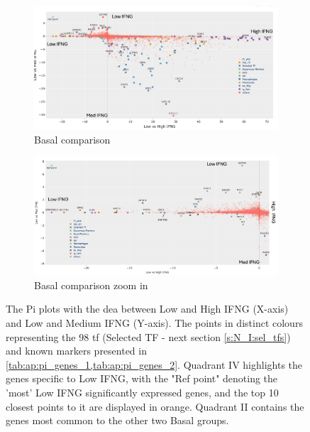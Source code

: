 \begin{figure}[H]
    \centering
    \begin{subfigure}[!t]{1.0\textwidth}
        \includegraphics[width=\textwidth,keepaspectratio]{Sections/ClusteringAnalysis/Resources/discussion/basal_comp_pi.png}    
        \caption{Basal comparison}
        \label{fig:cs:basal_comp}
    \end{subfigure}
    \centering
    \begin{subfigure}[!t]{1.0\textwidth}
        \includegraphics[width=\textwidth, keepaspectratio]{Sections/ClusteringAnalysis/Resources/discussion/basal_comp_pi_zoom.png}
        \caption{Basal comparison zoom in}
        \label{fig:cs:basal_comp_zoom}
    \end{subfigure} 
    \centering
    \caption{The Pi plots with the \acrshort{dea} between Low and High IFNG (X-axis) and Low and Medium IFNG (Y-axis). The points in distinct colours representing the 98 \acrlong{tf} (Selected TF - next section \cref{s:N_I:sel_tfs}) and known markers presented in \cref{tab:ap:pi_genes_1,tab:ap:pi_genes_2}. Quadrant IV highlights the genes specific to Low IFNG, with the "Ref point" denoting the 'most' Low IFNG significantly expressed genes, and the top 10 closest points to it are displayed in orange. Quadrant II contains the genes most common to the other two Basal groups.}
    \label{fig:cs:pi_basal}
\end{figure}

